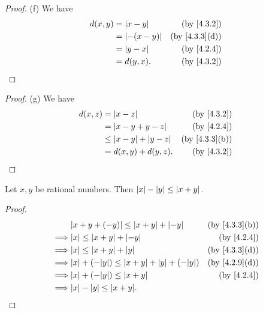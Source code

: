 \begin{proof}{(f)}
  We have
  \begin{align*}
    d(x, y) & = \abs{x - y}    & \text{(by \cref{4.3.2})}    \\
            & = \abs{-(x - y)} & \text{(by \cref{4.3.3}(d))} \\
            & = \abs{y - x}    & \text{(by \cref{4.2.4})}    \\
            & = d(y, x).       & \text{(by \cref{4.3.2})}
  \end{align*}
\end{proof}

\begin{proof}{(g)}
  We have
  \begin{align*}
    d(x, z) & = \abs{x - z}                  & \text{(by \cref{4.3.2})}    \\
            & = \abs{x - y + y - z}          & \text{(by \cref{4.2.4})}    \\
            & \leq \abs{x - y} + \abs{y - z} & \text{(by \cref{4.3.3}(b))} \\
            & = d(x, y) + d(y, z).           & \text{(by \cref{4.3.2})}    \\
  \end{align*}
\end{proof}

\begin{ac}\label{ac:4.3.1}
  Let \(x, y\) be rational numbers.
  Then \(\left\lvert x\right\rvert - \left\lvert y\right\rvert \leq \left\lvert x + y\right\rvert\).
\end{ac}

\begin{proof}
  \begin{align*}
             & \abs{x + y + (-y)} \leq \abs{x + y} + \abs{-y}               & \text{(by \cref{4.3.3}(b))} \\
    \implies & \abs{x} \leq \abs{x + y} + \abs{-y}                          & \text{(by \cref{4.2.4})}    \\
    \implies & \abs{x} \leq \abs{x + y} + \abs{y}                           & \text{(by \cref{4.3.3}(d))} \\
    \implies & \abs{x} + (-\abs{y}) \leq \abs{x + y} + \abs{y} + (-\abs{y}) & \text{(by \cref{4.2.9}(d))} \\
    \implies & \abs{x} + (-\abs{y}) \leq \abs{x + y}                        & \text{(by \cref{4.2.4})}    \\
    \implies & \abs{x} - \abs{y} \leq \abs{x + y}.
  \end{align*}
\end{proof}

